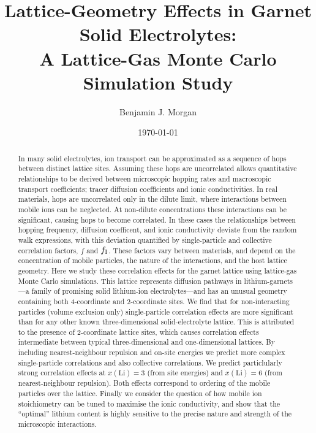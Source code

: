 \documentclass[aps,prb,twocolumn,superscriptaddress,reprint]{revtex4-1}
\begin{document}
\title{Lattice-Geometry Effects in Garnet Solid Electrolytes:\\ A Lattice-Gas Monte Carlo Simulation Study}
\author{Benjamin J. Morgan}

\date{\today}

\begin{abstract}
In many solid electrolytes, ion transport can be approximated as a sequence of hops between distinct lattice sites. Assuming these hops are uncorrelated allows quantitative relationships to be derived between microscopic hopping rates and macroscopic transport coefficients; tracer diffusion coefficients and ionic conductivities. In real materials, hops are uncorrelated only in the dilute limit, where interactions between mobile ions can be neglected. At non-dilute concentrations these interactions can be significant, causing hops to become correlated. In these cases the relationships between hopping frequency, diffusion coefficent, and ionic conductivity deviate from the random walk expressions, with this deviation quantified by single-particle and collective correlation factors, $f$ and $f_{\mathrm{I}}$. These factors vary between materials, and depend on the concentration of mobile particles, the nature of the interactions, and the host lattice geometry. 
Here we study these correlation effects for the garnet lattice using lattice-gas Monte Carlo simulations. This lattice represents diffusion pathways in lithium-garnets---a family of promising solid lithium-ion electrolytes---and has an unusual geometry containing both 4-coordinate and 2-coordinate sites. We find that for non-interacting particles (volume exclusion only) single-particle correlation effects are more significant than for any other known three-dimensional solid-electrolyte lattice. This is attributed to the presence of 2-coordinate lattice sites, which causes correlation effects intermediate between typical three-dimensional and one-dimensional lattices. By including nearest-neighbour repulsion and on-site energies we predict more complex single-particle correlations and also  collective correlations. We predict particlularly strong correlation effects at $x(\mathrm{Li})=3$ (from site energies) and $x(\mathrm{Li})=6$ (from nearest-neighbour repulsion). Both effects correspond to ordering of the mobile particles over the lattice. Finally we consider the question of how mobile ion stoichiometry can be tuned to maximise the ionic conductivity, and show that the ``optimal'' lithium content is highly sensitive to the precise nature and strength of the microscopic interactions. 
\end{abstract}
\end{document}

